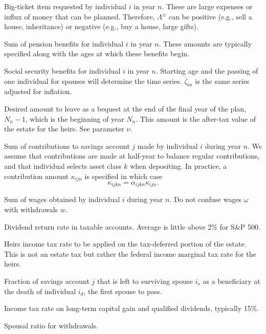 \documentclass{report}[fleqn,12pt]
\begin{document}
\begin{description}[leftmargin=4em,style=multiline]
\item [$\Lambda^\pm_{in}$]
	Big-ticket item requested by individual $i$ in year $n$.
	These are large expenses or influx of money
	that can be planned. Therefore, $\Lambda^\pm$ can be positive
	(e.g., sell a house, inheritance) or negative (e.g., buy a house, large gifts).
\item [$\pi_{in}$]
	Sum of pension benefits for individual $i$ in year $n$. These amounts are typically
	specified along with the ages at which these benefits begin.
\item [$\zeta_{in}$]
	Social security benefits for individual $i$ in year $n$. Starting age and the passing
	of one individual for spouses will determine the time series. $\bar{\zeta}_{in}$ is
	the same series adjusted for inflation.
\item [$\epsilon_{N_n}$]
	Desired amount to leave as a bequest at the end of the final year of the plan, $N_n-1$,
	which is the beginning of year $N_n$. This amount is the after-tax value of the estate
	for the heirs. See parameter $\nu$.
\item [$\kappa_{ijkn}$]
	Sum of contributions to savings account $j$ made by individual $i$ during year $n$.
	We assume that contributions are made at half-year to balance regular contributions,
	and that individual selects asset class $k$ when depositing. In practice, a contribution
	amount $\kappa_{ijn}$ is specified in which case 
	\begin{equation}
		\kappa_{ijkn} = \alpha_{ijkn}\kappa_{ijn}.
	\end{equation}
\item [$\omega_{in}$]
	Sum of wages obtained by individual $i$ during year $n$.
	Do not confuse wages $\omega$ with withdrawals $w$.
\item [$\mu$]
	Dividend return rate in taxable accounts. Average is little above 2\% for S\&P 500.
\item [$\nu$]
	Heirs income tax rate to be applied on the tax-deferred portion of the estate. This is not an estate tax
	but rather the federal income marginal tax rate for the heirs.
\item [$\phi_j$]
	Fraction of savings account $j$ that is left to surviving spouse $i_s$ as a beneficiary
	at the death of individual $i_d$, the first spouse to pass.
\item [$\psi$]
	Income tax rate on long-term capital gain and qualified dividends, typically 15\%.
\item [$\eta$]
	Spousal ratio for withdrawals.
\end{description}
\end{document}
